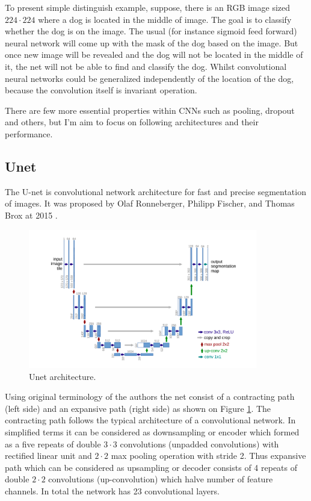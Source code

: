 To present simple distinguish example, suppose, there is an RGB image sized $224 \cdot 224$ where a dog is located in the middle of image. The goal is to classify whether the dog is on the image. The usual (for instance sigmoid feed forward) neural network will come up with the mask of the dog based on the image. But once new image will be revealed and the dog will not be located in the middle of it, the net will not be able to find and classify the dog. Whilst convolutional neural networks could be generalized independently of the location of the dog, because the convolution itself is invariant operation.         

There are few more essential properties within CNNs such as pooling, dropout and others, but I'm aim to focus on following architectures and their performance. 

\subsection{Unet}
The U-net is convolutional network architecture for fast and precise segmentation of images. It was proposed by Olaf Ronneberger, Philipp Fischer, and Thomas Brox at 2015 \cite{Ronneberger2015}. 

\begin{figure}[h]
    \centering \includegraphics[width=10cm]{images/unet.png}
    \caption {Unet architecture.}
    \label{fig:unet}
\end{figure}

Using original terminology of the authors \cite{Ronneberger2015} the net consist of a contracting path (left side) and an expansive path (right side) as shown on Figure \ref{fig:unet}. The contracting path follows the typical architecture of a convolutional network. In simplified terms it can be considered as downsampling or encoder which formed as
a five repeats of double $3 \cdot 3$ convolutions (unpadded convolutions) with rectified linear unit and $2 \cdot 2$ max pooling operation with stride 2. Thus expansive path which can be considered as upsampling or decoder consists of 4 repeats of double $2 \cdot 2$ convolutions (up-convolution) which halve number of feature channels. In total the network has 23 convolutional layers. 

